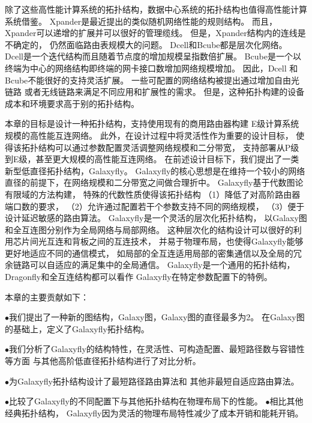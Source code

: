 除了这些高性能计算系统的拓扑结构，数据中心系统的拓扑结构也值得高性能计算系统借鉴。
Xpander是最近提出的类似随机网络性能的规则结构。
而且，Xpander可以递增的扩展并可以很好的管理缆线。
但是，Xpander结构内的连线是不确定的，
仍然面临路由表规模大的问题。
Dcell和Bcube都是层次化网络。
Dcell是一个迭代结构而且随着节点度的增加规模呈指数倍扩展。
Bcube是一个以终端为中心的网络结构即终端的网卡接口数增加网络规模增加。
因此，Dcell 和Bcube不能很好的支持灵活扩展。
一些可配置的网络结构被提出通过增加自由光链路
或者无线链路来满足不同应用和扩展性的需求。
但是，这种拓扑构建的设备成本和环境要求高于别的拓扑结构。

本章的目标是设计一种拓扑结构，支持使用现有的商用路由器构建
E级计算系统规模的高性能互连网络。
此外，在设计过程中将灵活性作为重要的设计目标，
使得该拓扑结构可以通过参数配置灵活调整网络规模和二分带宽，
支持部署从P级到E级，甚至更大规模的高性能互连网络。
在前述设计目标下，我们提出了一类新型低直径拓扑结构，Galaxyfly。
Galaxyfly的核心思想是在维持一个较小的网络直径的前提下，在网络规模和二分带宽之间做合理折中。
Galaxyfly基于代数图论有限域的方法构建，
特殊的代数性质使得该拓扑结构
（1）降低了对高阶路由器端口数的要求，
（2）允许通过配置若干个参数支持不同的网络规模，
（3）便于设计延迟敏感的路由算法。
Galaxyfly是一个灵活的层次化拓扑结构，
以Galaxy图和全互连图分别作为全局网络与局部网络。
这种层次化的结构设计可以很好的利用芯片间光互连和背板之间的互连技术，
并易于物理布局，也使得Galaxyfly能够更好地适应不同的通信模式，
如局部的全互连适用局部的密集通信以及全局的冗余链路可以自适应的满足集中的全局通信。
Galaxyfly是一个通用的拓扑结构，Dragonfly和全互连结构都可以看作
Galaxyfly在特定参数配置下的特例。

本章的主要贡献如下：

$\bullet$我们提出了一种新的图结构，Galaxy图，Galaxy图的直径最多为2。
在Galaxy图的基础上，定义了Galaxyfly拓扑结构。

$\bullet$我们分析了Galaxyfly的结构特性，在灵活性、可构造配置、最短路径数与容错性等方面
与其他高阶低直径拓扑结构进行了对比分析。

$\bullet$为Galaxyfly拓扑结构设计了最短路径路由算法和
其他非最短自适应路由算法。

$\bullet$比较了Galaxyfly的不同配置下与其他拓扑结构在物理布局下的性能。
$\bullet$相比其他经典拓扑结构，
Galaxyfly因为灵活的物理布局特性减少了成本开销和能耗开销。

